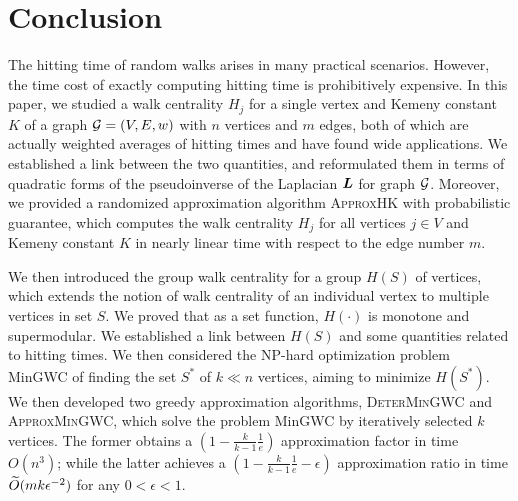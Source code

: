 \documentclass[10pt,twocolumn,twoside]{IEEEtran}
\begin{document}


\section{Conclusion}

The hitting time of random walks arises in many practical scenarios. However, the time cost of exactly computing hitting time is prohibitively expensive. In this paper, we studied a walk centrality $H_j$ for a single vertex and Kemeny constant $K$ of a graph \(\mathcal{G}=(V,E,w)\) with $n$ vertices and $m$ edges, both of which are actually weighted averages of hitting times and have found wide applications. We established a link between the two quantities, and reformulated them in terms of quadratic forms of the pseudoinverse of the Laplacian $\boldsymbol{L}$ for graph $\mathcal{G}$. Moreover, we provided a randomized approximation algorithm \textsc{ApproxHK} with probabilistic guarantee, which computes the walk centrality $H_j$ for all vertices $j \in V$ and Kemeny constant $K$ in nearly linear time with respect to the edge number $m$.

We then introduced the group walk centrality  for a group $H(S)$ of vertices, which extends the notion of walk centrality of an individual vertex to multiple vertices in set $S$. We proved that as a set function, $H(\cdot)$ is monotone and supermodular.
We established a link between  $H(S)$ and some quantities related to hitting times.  We then considered the NP-hard optimization problem MinGWC of finding the set $S^*$ of $k \ll n$ vertices, aiming to minimize $H(S^*)$. We then developed two greedy approximation algorithms, \textsc{DeterMinGWC} and \textsc{ApproxMinGWC}, which solve the problem MinGWC by iteratively selected $k$ vertices. The former obtains a $(1-\frac{k}{k-1} \frac{1}{e})$ approximation factor in time $O(n^3)$; while the latter achieves a $(1-\frac{k}{k-1}\frac{1}{e}-\epsilon)$ approximation ratio in time $\widetilde{O} (mk\epsilon^{-2})$ for any $0<\epsilon <1$.
\end{document}
